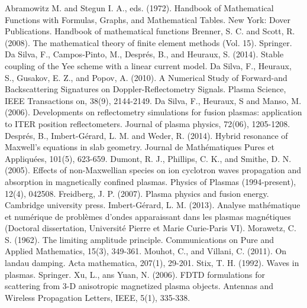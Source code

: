 \documentclass[proc]{edpsmath}
\begin{document}
\begin{thebibliography}{99}
 Abramowitz M. and Stegun I. A., eds. (1972). Handbook of Mathematical Functions with Formulas, Graphs, and Mathematical Tables. New York: Dover Publications.	Handbook of mathematical functions
 Brenner, S. C. and Scott, R. (2008). The mathematical theory of finite element methods (Vol. 15). Springer.
 Da Silva, F., Campos-Pinto, M., Després, B., and Heuraux, S. (2014). Stable coupling of the Yee scheme with a linear current model.
Da Silva, F., Heuraux, S., Gusakov, E. Z., and Popov, A. (2010). A Numerical Study of Forward-and Backscattering Signatures on Doppler-Reflectometry Signals. Plasma Science, IEEE Transactions on, 38(9), 2144-2149.
 Da Silva, F., Heuraux, S and  Manso, M. (2006). Developments on reflectometry simulations for fusion plasmas: application to ITER position reflectometers. Journal of plasma physics, 72(06), 1205-1208.
 Després, B., Imbert-Gérard, L. M. and Weder, R. (2014). Hybrid resonance of Maxwell's equations in slab geometry. Journal de Mathématiques Pures et Appliquées, 101(5), 623-659.
 Dumont, R. J., Phillips, C. K., and Smithe, D. N. (2005). Effects of non-Maxwellian species on ion cyclotron waves propagation and absorption in magnetically confined plasmas. Physics of Plasmas (1994-present), 12(4), 042508.
 Freidberg, J. P. (2007). Plasma physics and fusion energy. Cambridge university press.
 Imbert-Gérard, L. M. (2013). Analyse mathématique et numérique de problèmes d'ondes apparaissant dans les plasmas magnétiques (Doctoral dissertation, Université Pierre et Marie Curie-Paris VI).
 Morawetz, C. S. (1962). The limiting amplitude principle. Communications on Pure and Applied Mathematics, 15(3), 349-361.
 Mouhot, C., and Villani, C. (2011). On landau damping. Acta mathematica, 207(1), 29-201.
 Stix, T. H. (1992). Waves in plasmas. Springer.
 Xu, L., ans Yuan, N. (2006). FDTD formulations for scattering from 3-D anisotropic magnetized plasma objects. Antennas and Wireless Propagation Letters, IEEE, 5(1), 335-338.
\end{thebibliography}
\end{document}

